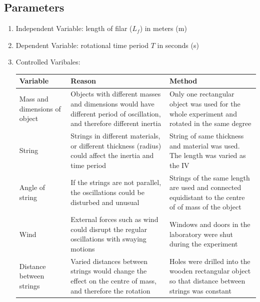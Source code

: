 \documentclass[a4paper,12pt]{article}
\theoremstyle{definition}
\begin{document}
	
	\subsection{Parameters}
	
	\begin{enumerate}
		\item Independent Variable: length of filar ($L_f$) in meters (\si{m})
		
		\item Dependent Variable: rotational time period $T$ in seconds (\si{s})
		
		\item Controlled Varibales:
	
	
\begin{table}[!h]
\begin{tabular}{|p{=3cm}|p{6cm}|p{6cm}|}
\hline
\textbf{Variable}             & \textbf{Reason}                                                                                                          & \textbf{Method} \\ \hline
Mass and dimensions of object & Objects with different masses and dimensions would have different period of oscillation, and therefore different inertia & Only one rectangular object was used for the whole experiment and rotated in the same degree                \\ \hline
String                        & Strings in different materials, or different thickness (radius) could affect the inertia and time period                 & String of same thickness and material was used. The length was varied as the IV               \\ \hline
Angle of string               & If the strings are not parallel, the oscillations could be disturbed and unusual                                                                                                                         & Strings of the same length are used and connected equidistant to the centre of of mass of the object                \\ \hline
Wind                          & External forces such as wind could disrupt the regular oscillations with swaying motions                                                                                                                          & Windows and doors in the laboratory were shut during the experiment                \\ \hline
Distance between strings      &    Varied distances between strings would change the effect on the centre of mass, and therefore the rotation                                                                                                                      &   Holes were drilled into the wooden rectangular object so that distance between strings was constant              \\ \hline
\end{tabular}
\end{table}
\end{enumerate}
\end{document}
